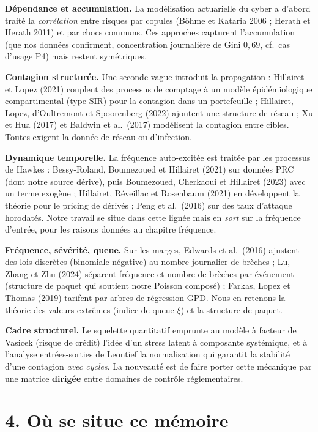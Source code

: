 \documentclass[11pt,a4paper]{article}
\begin{document}
\textbf{Dépendance et accumulation.} La modélisation actuarielle du cyber a d'abord traité la
\emph{corrélation} entre risques par copules (Böhme et Kataria 2006 ; Herath et Herath 2011)
et par chocs communs. Ces approches capturent l'accumulation (que nos données confirment,
concentration journalière de Gini $0{,}69$, cf.\ cas d'usage P4) mais restent symétriques.

\textbf{Contagion structurée.} Une seconde vague introduit la propagation : Hillairet et Lopez
(2021) couplent des processus de comptage à un modèle épidémiologique compartimental (type
SIR) pour la contagion dans un portefeuille ; Hillairet, Lopez, d'Oultremont et Spoorenberg
(2022) ajoutent une structure de réseau ; Xu et Hua (2017) et Baldwin et al.\ (2017)
modélisent la contagion entre cibles. Toutes exigent la donnée de réseau ou d'infection.

\textbf{Dynamique temporelle.} La fréquence auto-excitée est traitée par les processus de
Hawkes : Bessy-Roland, Boumezoued et Hillairet (2021) sur données PRC (dont notre source
dérive), puis Boumezoued, Cherkaoui et Hillairet (2023) avec un terme exogène ; Hillairet,
Réveillac et Rosenbaum (2021) en développent la théorie pour le pricing de dérivés ; Peng et
al.\ (2016) sur des taux d'attaque horodatés. Notre travail se situe dans cette lignée mais
en \emph{sort} sur la fréquence d'entrée, pour les raisons données au chapitre fréquence.

\textbf{Fréquence, sévérité, queue.} Sur les marges, Edwards et al.\ (2016) ajustent des lois
discrètes (binomiale négative) au nombre journalier de brèches ; Lu, Zhang et Zhu (2024)
séparent fréquence et nombre de brèches par événement (structure de paquet qui soutient notre
Poisson composé) ; Farkas, Lopez et Thomas (2019) tarifent par arbres de régression GPD. Nous
en retenons la théorie des valeurs extrêmes (indice de queue $\xi$) et la structure de paquet.

\textbf{Cadre structurel.} Le squelette quantitatif emprunte au modèle à facteur de Vasicek
(risque de crédit) l'idée d'un stress latent à composante systémique, et à l'analyse
entrées-sorties de Leontief la normalisation qui garantit la stabilité d'une contagion
\emph{avec cycles}. La nouveauté est de faire porter cette mécanique par une matrice
\textbf{dirigée} entre domaines de contrôle réglementaires.

\section*{4. Où se situe ce mémoire}
\end{document}
